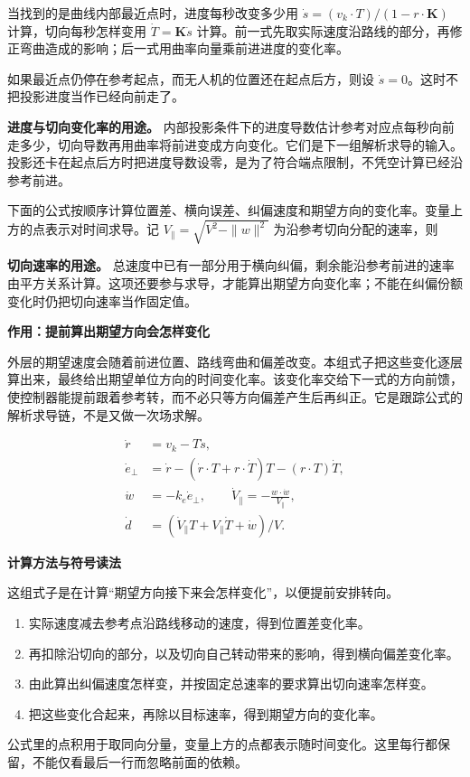 \documentclass[12pt,a4paper]{article}
\numberwithin{equation}{topic}
\begin{document}
当找到的是曲线内部最近点时，进度每秒改变多少用 \(\dot s=(v_k\cdot T)/(1-r\cdot\mathbf K)\) 计算，切向每秒怎样变用 \(\dot T=\mathbf K\dot s\) 计算。前一式先取实际速度沿路线的部分，再修正弯曲造成的影响；后一式用曲率向量乘前进进度的变化率。

如果最近点仍停在参考起点，而无人机的位置还在起点后方，则设 \(\dot s=0\)。这时不把投影进度当作已经向前走了。

\textbf{进度与切向变化率的用途。} 内部投影条件下的进度导数估计参考对应点每秒向前走多少，切向导数再用曲率将前进变成方向变化。它们是下一组解析求导的输入。投影还卡在起点后方时把进度导数设零，是为了符合端点限制，不凭空计算已经沿参考前进。

下面的公式按顺序计算位置差、横向误差、纠偏速度和期望方向的变化率。变量上方的点表示对时间求导。记 \(V_\parallel=\sqrt{V^2-\|w\|^2}\) 为沿参考切向分配的速率，则

\textbf{切向速率的用途。} 总速度中已有一部分用于横向纠偏，剩余能沿参考前进的速率由平方关系计算。这项还要参与求导，才能算出期望方向变化率；不能在纠偏份额变化时仍把切向速率当作固定值。

\noindent\textbf{作用：提前算出期望方向会怎样变化}\par\nobreak
外层的期望速度会随着前进位置、路线弯曲和偏差改变。本组式子把这些变化逐层算出来，最终给出期望单位方向的时间变化率。该变化率交给下一式的方向前馈，使控制器能提前跟着参考转，而不必只等方向偏差产生后再纠正。它是跟踪公式的解析求导链，不是又做一次场求解。

\begin{equation}
\label{eq:derivatives}
\begin{aligned}
\dot r&=v_k-T\dot s,\\
\dot e_\perp&=\dot r-
    (\dot r\cdot T+r\cdot\dot T)T-(r\cdot T)\dot T,\\
\dot w&=-k_e\dot e_\perp,\qquad
\dot V_\parallel=-\frac{w\cdot\dot w}{V_\parallel},\\
\dot d&=(\dot V_\parallel T+V_\parallel\dot T+\dot w)/V.
\end{aligned}
\end{equation}

\noindent\textbf{计算方法与符号读法}\par\nobreak
这组式子是在计算“期望方向接下来会怎样变化”，以便提前安排转向。
\begin{enumerate}
\item 实际速度减去参考点沿路线移动的速度，得到位置差变化率。
\item 再扣除沿切向的部分，以及切向自己转动带来的影响，得到横向偏差变化率。
\item 由此算出纠偏速度怎样变，并按固定总速率的要求算出切向速率怎样变。
\item 把这些变化合起来，再除以目标速率，得到期望方向的变化率。
\end{enumerate}
公式里的点积用于取同向分量，变量上方的点都表示随时间变化。这里每行都保留，不能仅看最后一行而忽略前面的依赖。
\end{document}

